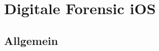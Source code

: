 %
%
% 
% 


\chapter{Digitale Forensic iOS}
\label{ch:DF}

\section{Allgemein}
\label{sec:DFAllgemein}


